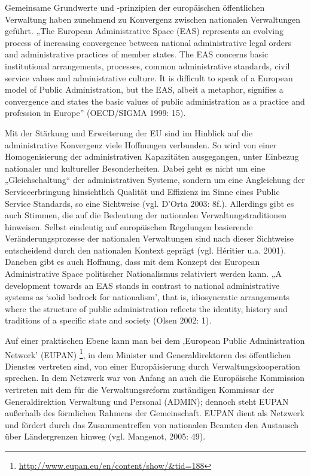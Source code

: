 Gemeinsame Grundwerte und -prinzipien der europäischen öffentlichen Verwaltung haben zunehmend zu Konvergenz zwischen nationalen Verwaltungen geführt. „The European Administrative Space (EAS) represents an evolving process of increasing convergence between national administrative legal orders and administrative practices of member states. The EAS concerns basic institutional arrangements, processes, common administrative standards, civil service values and administrative culture. It is difficult to speak of a European model of Public Administration, but the EAS, albeit a metaphor, signifies a convergence and states the basic values of public administration as a practice and profession in Europe” (OECD/SIGMA 1999: 15). \par
Mit der Stärkung und Erweiterung der EU sind im Hinblick auf die administrative Konvergenz viele Hoffnungen verbunden. So wird von einer Homogenisierung der administrativen Kapazitäten ausgegangen, unter Einbezug nationaler und kultureller Besonderheiten. Dabei geht es nicht um eine „Gleichschaltung“ der administrativen Systeme, sondern um eine Angleichung der Serviceerbringung hinsichtlich Qualität und Effizienz im Sinne eines Public Service Standards, so eine Sichtweise (vgl. D’Orta 2003: 8f.). Allerdings gibt es auch Stimmen, die auf die Bedeutung der nationalen Verwaltungstraditionen hinweisen. Selbst eindeutig auf europäischen Regelungen basierende Veränderungsprozesse der nationalen Verwaltungen sind nach dieser Sichtweise entscheidend durch den nationalen Kontext geprägt (vgl. Héritier u.a. 2001). Daneben gibt es auch Hoffnung, dass mit dem Konzept des European Administrative Space politischer Nationalismus relativiert werden kann. „A development towards an EAS stands in contrast to national administrative systems as ‘solid bedrock for nationalism’, that is, idiosyncratic arrangements where the structure of public administration reflects the identity, history and traditions of a specific state and society (Olsen 2002: 1).\par
Auf einer praktischen Ebene kann man bei dem ‚European Public Administration Network’ (EUPAN) \footnote{\url{http://www.eupan.eu/en/content/show/&tid=188}}, in dem Minister und Generaldirektoren des öffentlichen Dienstes vertreten sind, von einer Europäisierung durch Verwaltungskooperation sprechen. In dem Netzwerk war von Anfang an auch die Europäische Kommission vertreten mit dem für die Verwaltungsreform zuständigen Kommissar der Generaldirektion Verwaltung und Personal (ADMIN); dennoch steht EUPAN außerhalb des förmlichen Rahmens der Gemeinschaft. EUPAN dient als Netzwerk und fördert durch das Zusammentreffen von nationalen Beamten den Austausch über Ländergrenzen hinweg (vgl. Mangenot, 2005: 49).\par
